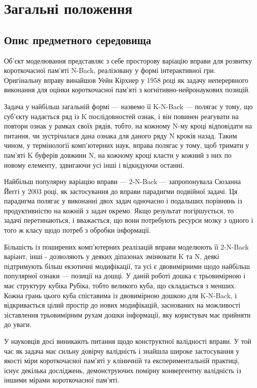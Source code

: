 \section{Загальні положення}
\subsection{Опис предметного середовища}

Об'єкт моделювання представляє з себе просторову варіацію вправи для розвитку короткочасної пам'яті N-Back, реалізовану у формі інтерактивної гри. Оригінальну вправу винайшов Уейн Кірхнер у 1958 році\cite{kirchner} як задачу неперервного виконання для оцінки короткочасної пам'яті з когнітивно-нейронаукових позицій.

Задача у найбільш загальній формі — назвемо її K-N-Back — полягає у тому, що суб'єкту надається ряд із K послідовностей ознак, і він повинен реагувати на повтори ознак у рамках своїх рядів, тобто, на кожному N-му кроці відповідати на питання, чи зустрічалася дана ознака для даного ряду N кроків назад. Таким чином, у термінології комп'ютерних наук, вправа полягає у тому, щоб тримати у пам'яті K буферів довжини N, на кожному кроці класти у кожний з них по новому елементу, здвигаючи усі інші і відкидуючи останні.

Найбільш популярну варіацію вправи — 2-N-Back — запропонувала Сюзанна Йеггі у 2003 році\cite{jaeggi}, як застосування до вправи парадигми подвійної задачі. Ця парадигма полягає у виконанні двох задач одночасно і подальших порівнянь із продуктивністю на кожній з задач окремо. Якщо результат погіршується, то задачі перетинаються, і вважається, що вони потребують ресурси мозку з одного і того ж класу щодо потреб з обробки інформації.

Більшість із поширених комп'ютерних реалізацій вправи моделюють її 2-N-Back варіант, інші - дозволяють у деяких діпазонах змінювати K та N, деякі підтримують більш екзотичні модифікації, та усі є двовимірними щодо найбільш популярної ознаки — позиції на дошці. У даній роботі дошка є трьовимірною і має структуру кубіка Рубіка, тобто великого куба, що складається з менших. Кожна грань цього куба спіставима із двовимірною дошкою для K-N-Back, і відкривається цілий простір до нових модифікацій, заснованих на можливості зіставлення трьовимірним рухам дошки інформації, яку користувач має прийняти до уваги.

У науковців досі виникають питання щодо конструктної валідності вправи. У той час як задача має сильну довірчу валідність і знайшла широке застосування у якості міри короткочасної пам'яті у кліничній та експериментальній практиці, існує декілька досліджень, демонструючих помірну конвергентну валідність із іншими мірами короткочасної пам'яті\cite{kane-conway}\cite{jaeggi-buschkuehl}.

